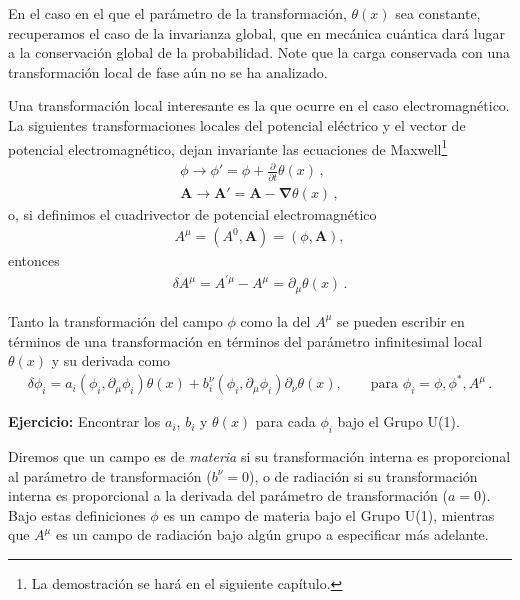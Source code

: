 En el caso en el que el parámetro de la transformación, $\theta(x)$ sea constante, recuperamos el caso de la invarianza global, que en mecánica cuántica dará lugar a la conservación global de la probabilidad. Note que la carga conservada con una transformación local de fase aún no se ha analizado.

Una transformación local interesante es la que ocurre en el caso electromagnético. La siguientes transformaciones locales del potencial eléctrico y el vector de potencial electromagnético, dejan invariante las ecuaciones de Maxwell\footnote{La demostración se hará en el siguiente capítulo.}
\begin{align}
  \phi \to \phi'=\phi+\frac{\partial}{\partial t}\theta(x)\,,\nonumber\\
  \mathbf{A} \to \mathbf{A}'=\mathbf{A}- \boldsymbol{\nabla}\theta(x)\,,
\end{align}
o, si definimos el cuadrivector de potencial electromagnético
\begin{align}
  A^{\mu}=(A^0,\mathbf{A})=(\phi,\mathbf{A}),
\end{align}
entonces %
\begin{align}
  \delta A^{\mu}=A^{\prime\mu}-A^{\mu}=\partial_\mu \theta(x)\,.
\end{align}

\begin{frame}
Tanto la transformación del campo $\phi$ como la del $A^{\mu}$ se pueden escribir en términos de una transformación en términos del parámetro infinitesimal local $\theta(x)$ y su derivada como
\begin{align}
\label{eq:dfi}
  \delta\phi_i= a_{i}\left( \phi_{i},\partial_{\mu}\phi_{i} \right) \theta(x)+b^{\nu}_i \left( \phi_{i},\partial_{\mu}\phi_{i} \right) \partial_{\nu}\theta(x),\qquad \text{para $\phi_{i}=\phi,\phi^{*},A^{\mu}$}\,.
\end{align}
\end{frame}
\textbf{Ejercicio:} Encontrar los $a_i$, $b_i$ y  $\theta(x)$ para cada $\phi_i$ bajo el Grupo U(1).

Diremos que un campo es de \emph{materia} si su transformación interna es proporcional al parámetro de transformación ($b^{\nu}=0$), o de radiación si su transformación interna es proporcional a la derivada del parámetro de transformación ($a=0$). Bajo estas definiciones $\phi$ es un campo de materia bajo el Grupo U(1), mientras que $A^{\mu}$ es un campo de radiación bajo algún grupo a especificar más adelante. 


